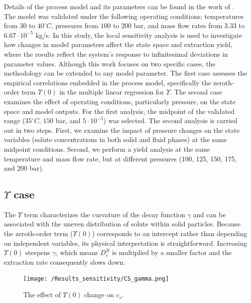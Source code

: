\documentclass[a4paper,fleqn]{cas-dc}
\begin{document}
	Details of the process model and its parameters can be found in the work of \citet{Sliczniuk2024}. The model was validated under the following operating conditions: temperatures from $30$ to $40 ^\circ C$, pressures from $100$ to $200$ bar, and mass flow rates from $3.33$ to $6.67 \cdot 10^{-5}$ kg/s. In this study, the local sensitivity analysis is used to investigate how changes in model parameters affect the state space and extraction yield, where the results reflect the system’s response to infinitesimal deviations in parameter values. Although this work focuses on two specific cases, the methodology can be extended to any model parameter. The first case assesses the empirical correlations embedded in the process model, specifically the zeroth-order term $\Upsilon(0)$ in the multiple linear regression for $\Upsilon$. The second case examines the effect of operating conditions, particularly pressure, on the state space and model outputs. For the first analysis, the midpoint of the validated range ($35 ^\circ C$, $150$ bar, and $5\cdot 10^{-5}$) was selected. The second analysis is carried out in two steps. First, we examine the impact of pressure changes on the state variables (solute concentrations in both solid and fluid phases) at the same midpoint conditions. Second, we perform a yield analysis at the same temperature and mass flow rate, but at different pressures (100, 125, 150, 175, and 200 bar).
	
	\subsection{$\Upsilon$ case}
	
	The $\Upsilon$ term characterizes the curvature of the decay function $\gamma$ and can be associated with the uneven distribution of solute within solid particles. Because the zeroth-order term ($\Upsilon(0)$) corresponds to an intercept rather than depending on independent variables, its physical interpretation is straightforward. Increasing $\Upsilon(0)$ steepens $\gamma$, which means $D_i^R$ is multiplied by a smaller factor and the extraction rate consequently slows down.
	
	\begin{figure}[!ht]
		\centering
		\texttt{[image: /Results\_sensitivity/CS\_gamma.png]}
		\caption{The effect of $\Upsilon(0)$ change on $c_s$.}
		\label{fig:Sensitivty_Gamma_CS}
	\end{figure}
	
\end{document}
